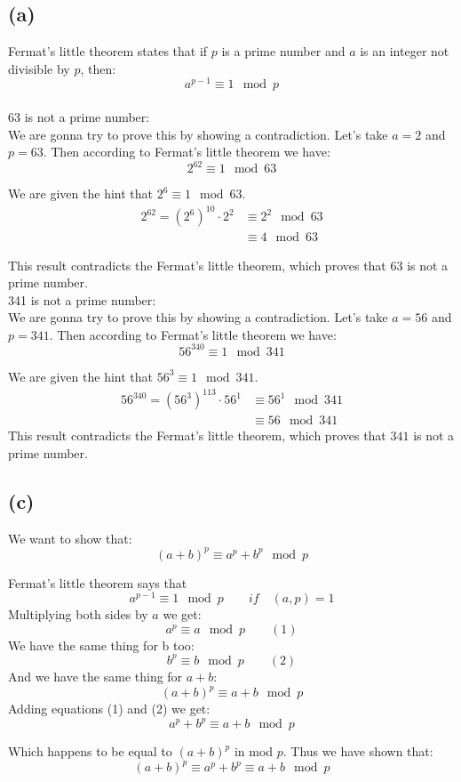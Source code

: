 \documentclass{article}
\begin{document}
\subsection*{(a)}


Fermat's little theorem states that if \(p\) is a prime number and \(a\) is an integer not divisible by \(p\), then:
\[
   a^{p-1} \equiv 1 \mod p
\]
\\
63 is not a prime number: \\
We are gonna try to prove this by showing a contradiction. Let's take \(a = 2\) and \(p = 63\).
Then according to Fermat's little theorem we have:
\[
   2^{62} \equiv 1 \mod 63
\]

We are given the hint that \(2^6 \equiv 1 \mod 63\).
\begin{align*}
   2^{62} = (2^6)^{10} \cdot 2^2 &\equiv 2^2 \mod 63 \\
                                 &\equiv 4 \mod 63
\end{align*}

This result contradicts the Fermat's little theorem, which proves that \(63\) is not a prime number.
\\
341 is not a prime number: \\
We are gonna try to prove this by showing a contradiction. Let's take \(a = 56\) and \(p = 341\).
Then according to Fermat's little theorem we have:
\[
   56^{340} \equiv 1 \mod 341
\]

We are given the hint that \(56^3 \equiv 1 \mod 341\).
\begin{align*}
   56^{340} = (56^3)^{113} \cdot 56^1 &\equiv 56^1 \mod 341 \\
                                       &\equiv 56 \mod 341
\end{align*}
This result contradicts the Fermat's little theorem, which proves that \(341\) is not a prime number.

\subsection*{(c)}


We want to show that:
\[
   (a + b)^p \equiv a^p + b^p \mod p
\]

Fermat's little theorem says that
\[
   a^{p-1} \equiv 1 \mod p \qquad if \quad (a,p) = 1
\]
Multiplying both sides by \(a\) we get:
\[
   a^p \equiv a \mod p \qquad (1)
\]
We have the same thing for b too:
\[
   b^p \equiv b \mod p \qquad (2)
\]
And we have the same thing for \(a + b\):
\[
   (a + b)^p \equiv a + b \mod p
\]
Adding equations (1) and (2) we get:
\[
   a^p + b^p \equiv a + b \mod p
\]

Which happens to be equal to \((a + b)^p\) in mod \(p\).
Thus we have shown that:
\[
   (a + b)^p \equiv a^p + b^p \equiv a + b \mod p
\]
\end{document}
